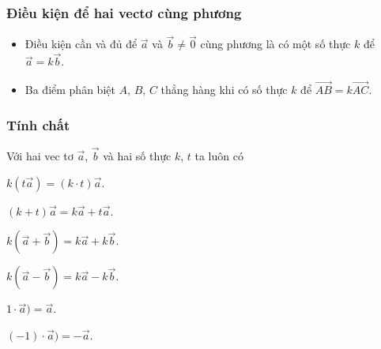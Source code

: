 \subsubsection{Điều kiện để hai vectơ cùng phương}
\begin{gachsoc}
	\begin{itemize}
		\item [\ding{172}] Điều kiện cần và đủ để $\overrightarrow{a}$ và $\overrightarrow{b} \ne \overrightarrow{0}$ cùng phương là có một số thực $k$ để $\overrightarrow{a}=k\overrightarrow{b}$.
		\item [\ding{173}] Ba điểm phân biệt $A$, $B$, $C$ thẳng hàng khi có số thực $k$ để $\overrightarrow{AB}=k\overrightarrow{AC}$.
	\end{itemize}
\end{gachsoc}
\subsubsection{Tính chất}
\begin{tcolorbox}[colframe=orange,colback=white,boxrule=0.2mm]
	Với hai vec tơ $\vec{a}$, $\vec{b}$ và hai số thực $k$, $t$ ta luôn có
	\begin{listEX}[3]
		\item [$\bullet$] $k(t\vec{a})=(k \cdot t)\vec{a}$.
		\item [$\bullet$] $(k+t)\vec{a}=k\vec{a}+t\vec{a}$.
		\item [$\bullet$] $k(\vec{a}+\vec{b})=k\vec{a}+k\vec{b}$.
		\item [$\bullet$] $k(\vec{a}-\vec{b})=k\vec{a}-k\vec{b}$.
		\item [$\bullet$] $1\cdot \vec{a})=\vec{a}$. 
		\item [$\bullet$] $(-1)\cdot \vec{a})=-\vec{a}$.
	\end{listEX}
\end{tcolorbox}
